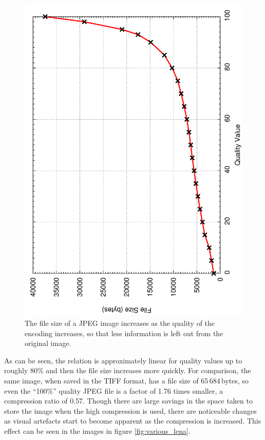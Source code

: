 \begin{figure}[ht]
\begin{minipage}[c]{0.65\linewidth}
		\includegraphics[angle=270,width=\textwidth]{qualityvsfilesize.pdf}
	\end{minipage}
	\caption{The file size of a JPEG image increases as the quality of the encoding increases, so that less information is left out from the original image.\label{fig:percent_vs_size}}
\end{figure}

As can be seen, the relation is approximately linear for quality values up to roughly 80\% and then the file size increases more quickly. For comparison, the same image, when saved in the TIFF format, has a file size of 65\,684\,bytes, so even the ``100\%'' quality JPEG file is a factor of 1.76 times smaller, a compression ratio of 0.57. Though there are large savings in the space taken to store the image when the high compression is used, there are noticeable changes as visual artefacts start to become apparent as the compression is increased. This effect can be seen in the images in figure \ref{fig:various_lena}.

